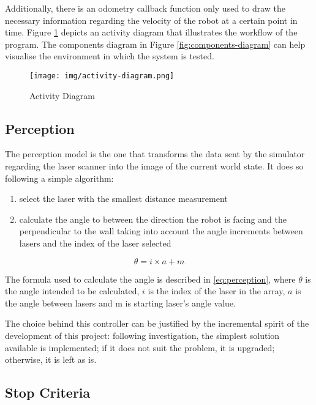 \documentclass[conference]{IEEEtran}
\begin{document}
Additionally, there is an odometry callback function only used to draw the necessary information regarding the velocity of the robot at a certain point in time. Figure \ref{fig:activity-diagram} depicts an activity diagram that illustrates the workflow of the program. The components diagram in Figure \ref{fig:components-diagram} can help visualise the environment in which the system is tested.

\begin{figure}
    \centering
    \texttt{[image: img/activity-diagram.png]}
    \caption{Activity Diagram}
    \label{fig:activity-diagram}
\end{figure}

\subsection{Perception}
The perception model is the one that transforms the data sent by the simulator regarding the laser scanner into the image of the current world state. It does so following a simple algorithm:
\begin{enumerate}
    \item select the laser with the smallest distance measurement
    \item calculate the angle to between the direction the robot is facing and the perpendicular to the wall taking into account the angle increments between lasers and the index of the laser selected
\end{enumerate}

\begin{equation} \label{eq:perception}
    \theta = i \times a + m
\end{equation}

The formula used to calculate the angle is described in \ref{eq:perception}, where $\theta$ is the angle intended to be calculated, $i$ is the index of the laser in the array, $a$ is the angle between lasers and m is starting laser's angle value. 

The choice behind this controller can be justified by the incremental spirit of the development of this project: following investigation, the simplest solution available is implemented; if it does not suit the problem, it is upgraded; otherwise, it is left as is.

\subsection{Stop Criteria}
\end{document}
